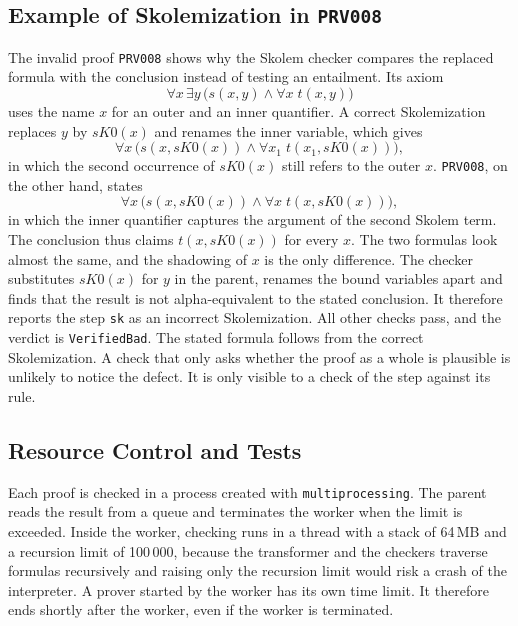 \subsection{Example of Skolemization in \texttt{PRV008}}
\label{subsec:impl-example}

The invalid proof \texttt{PRV008} shows why the Skolem checker compares the replaced formula with the conclusion instead of testing an entailment.
Its axiom
\[
\forall x\,\exists y\,\bigl(s(x,y) \land \forall x\; t(x,y)\bigr)
\]
uses the name $x$ for an outer and an inner quantifier.
A correct Skolemization replaces $y$ by $\mathit{sK0}(x)$ and renames the inner variable, which gives
\[
\forall x\,\bigl(s(x,\mathit{sK0}(x)) \land \forall x_1\; t(x_1,\mathit{sK0}(x))\bigr),
\]
in which the second occurrence of $\mathit{sK0}(x)$ still refers to the outer $x$.
\texttt{PRV008}, on the other hand, states
\[
\forall x\,\bigl(s(x,\mathit{sK0}(x)) \land \forall x\; t(x,\mathit{sK0}(x))\bigr),
\]
in which the inner quantifier captures the argument of the second Skolem term. The conclusion thus claims $t(x,\mathit{sK0}(x))$ for every $x$.
The two formulas look almost the same, and the shadowing of $x$ is the only difference.
The checker substitutes $\mathit{sK0}(x)$ for $y$ in the parent, renames the bound variables apart and finds that the result is not alpha-equivalent to the stated conclusion. It therefore reports the step \texttt{sk} as an incorrect Skolemization.
All other checks pass, and the verdict is \texttt{VerifiedBad}.
The stated formula follows from the correct Skolemization. A check that only asks whether the proof as a whole is plausible is unlikely to notice the defect.
It is only visible to a check of the step against its rule.

\subsection{Resource Control and Tests}
\label{subsec:impl-resources}

Each proof is checked in a process created with \texttt{multiprocessing}. The parent reads the result from a queue and terminates the worker when the limit is exceeded.
Inside the worker, checking runs in a thread with a stack of 64\,MB and a recursion limit of 100\,000, because the transformer and the checkers traverse formulas recursively and raising only the recursion limit would risk a crash of the interpreter.
A prover started by the worker has its own time limit. It therefore ends shortly after the worker, even if the worker is terminated.

